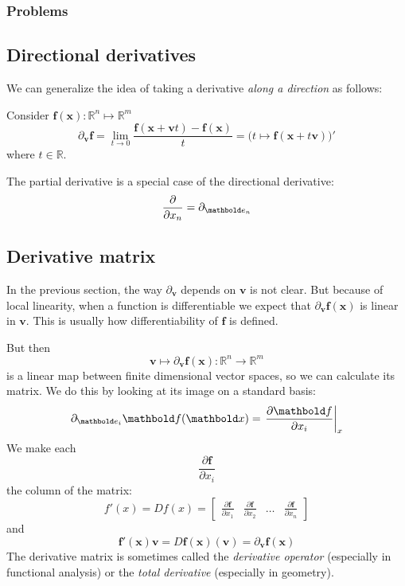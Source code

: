 \documentclass{scrartcl}
\renewcommand{\ref}{\hyperref}
\providecommand{\R}{\mathbb{R}}
\renewcommand{\vec}{\mathbold}
\newcommand{\f}{\vec f}
\begin{document}
\subsubsection*{Problems}
\subsection{Directional derivatives}
We can generalize the idea of taking a derivative \emph{along a direction} as follows:

Consider $\f(\vec x):\R^n\mapsto\R^m$
\[
  \partial_{\vec v} \f = \lim_{t\to 0}\frac{\f(\vec x + \vec vt)-\f(\vec x)}{t} = \big(t\mapsto \f(\vec x +t\vec v)\big)'
\]
where $t\in \R$.

The partial derivative is a special case of the directional derivative:
\[
  \frac{\partial}{\partial x_n}=\partial_{\basis_n}
\]
\subsection{Derivative matrix}
In the previous section, the way $\partial_{\vec v}$ depends on $\vec v$ is not clear. But because of local linearity, when a function is differentiable we expect that
  $\partial_{\vec v}\f(\vec x)$
is linear in $\vec v$. This is usually how differentiability of $\f$ is defined.

But then
\[
  \vec v \mapsto \partial_{\vec v} \f(\vec x) : \R^n \to \R^m
\]
is a linear map between finite dimensional vector spaces, so we can calculate its matrix. We do this by looking at its image on a standard basis:
\[
  \partial_{\basis_i}\f(\vec x) = \left . \frac{\partial \f}{\partial x_i}\right|_x
\]
We make each
\[
  \frac{\partial \f}{\partial x_i}
\]
the column of the matrix:
\[
  f'(x)=Df(x)=
  \begin{bmatrix}
    \frac{\partial \f}{\partial x_1} &
  \frac{\partial \f}{\partial x_2} &
  \dots &
  \frac{\partial \f}{\partial x_n}
  \end{bmatrix}
\]
and
\[
  \f'(\vec x)\vec v=D\f(\vec x)(\vec v)=\partial_{\vec v}\f(\vec x)
\]
The derivative matrix is sometimes called the \emph{derivative operator} (especially in functional analysis) or the \emph{total derivative} (especially in geometry).
\end{document}
